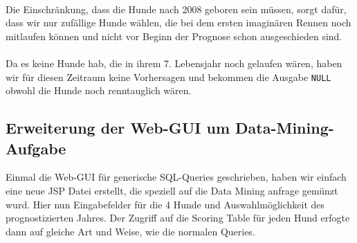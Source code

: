 \documentclass[10pt,a4paper]{article}
\begin{document}
			\\
		Die Einschränkung, dass die Hunde nach 2008 geboren sein müssen, sorgt dafür, dass wir nur zufällige Hunde wählen, die bei dem ersten imaginären Rennen noch mitlaufen können und nicht vor Beginn der Prognose schon ausgeschieden sind.\\
		\\
		Da es keine Hunde hab, die in ihrem 7. Lebensjahr noch gelaufen wären, haben wir für diesen Zeitraum keine Vorhersagen und bekommen die Ausgabe \texttt{NULL} obwohl die Hunde noch renntauglich wären.

	\subsection{Erweiterung der Web-GUI um Data-Mining-Aufgabe}
	Einmal die Web-GUI für generische SQL-Queries geschrieben, haben wir einfach eine neue JSP Datei erstellt, die speziell auf die Data Mining anfrage gemünzt wurd. Hier nun Eingabefelder für die 4 Hunde und Auswahlmöglichkeit des prognostizierten Jahres. Der Zugriff auf die Scoring Table für jeden Hund erfogte dann auf gleiche Art und Weise, wie die normalen Queries.
	
	
\end{document}

